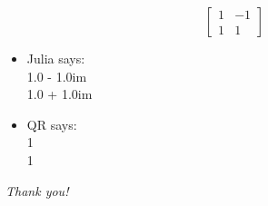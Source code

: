 \documentclass{beamer}
\begin{document}
\begin{frame}{}
$$ \begin{bmatrix}
1 & -1 \\
1 & 1 
\end{bmatrix}  $$
\begin{itemize}
	\item Julia says: 
	\\
	1.0 - 1.0im
\\
 1.0 + 1.0im
 	\item QR says: 
 	\\
 	1
 	\\ 1
\end{itemize}
\end{frame}


\begin{frame}{}
  \begin{minipage}[t][.8\textheight]{\textwidth}
    \centering \huge
    \vspace{60 pt}
    \emph{Thank you!}
    \vfill
   \end{minipage}
\end{frame}
\end{document}
